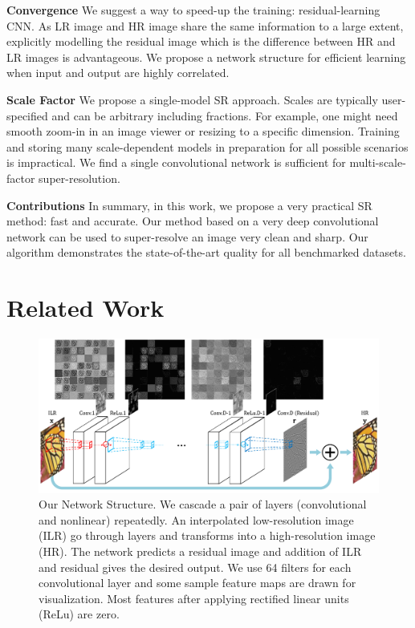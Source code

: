 \documentclass[10pt,twocolumn,letterpaper]{article}
\begin{document}
\textbf{Convergence} We suggest a way to speed-up the training: residual-learning CNN. As LR image and HR image share the same information to a large extent, explicitly modelling the residual image which is the difference between HR and LR images is advantageous. We propose a network structure for efficient learning when input and output are highly correlated.

\textbf{Scale Factor} We propose a single-model SR approach. Scales are typically user-specified and can be arbitrary including fractions. For example, one might need smooth zoom-in in an image viewer or resizing to a specific dimension. Training and storing many scale-dependent models in preparation for all possible scenarios is impractical. We find a single convolutional network is sufficient for multi-scale-factor super-resolution.


\textbf{Contributions} In summary, in this work, we propose a very practical SR method: fast and accurate. Our method based on a very deep convolutional network can be used to super-resolve an image very clean and sharp. Our algorithm demonstrates the state-of-the-art quality for all benchmarked datasets.


\section{Related Work}
\begin{figure}[t]
\includegraphics[width=\textwidth]{figs/fig2_sffsr.pdf}
\caption{Our Network Structure. We cascade a pair of layers (convolutional and nonlinear) repeatedly. An interpolated low-resolution image (ILR) go through layers and transforms into a high-resolution image (HR). The network predicts a residual image and addition of ILR and residual gives the desired output. We use 64 filters for each convolutional layer and some sample feature maps are drawn for visualization. Most features after applying rectified linear units (ReLu) are zero.}
\label{fig:network}
\end{figure}
\end{document}

